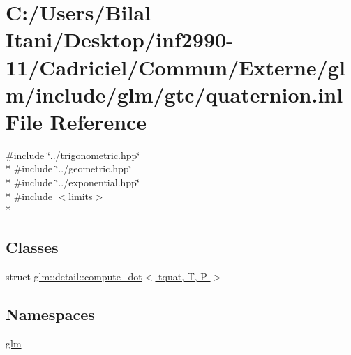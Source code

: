 \hypertarget{glm_2include_2glm_2gtc_2quaternion_8inl}{}\section{C\+:/\+Users/\+Bilal Itani/\+Desktop/inf2990-\/11/\+Cadriciel/\+Commun/\+Externe/glm/include/glm/gtc/quaternion.inl File Reference}
\label{glm_2include_2glm_2gtc_2quaternion_8inl}
{\ttfamily \#include \char`\"{}../trigonometric.\+hpp\char`\"{}}\\*
{\ttfamily \#include \char`\"{}../geometric.\+hpp\char`\"{}}\\*
{\ttfamily \#include \char`\"{}../exponential.\+hpp\char`\"{}}\\*
{\ttfamily \#include $<$limits$>$}\\*
\subsection*{Classes}
\begin{DoxyCompactItemize}
\item 
struct \hyperlink{structglm_1_1detail_1_1compute__dot_3_01tquat_00_01_t_00_01_p_01_4}{glm\+::detail\+::compute\+\_\+dot$<$ tquat, T, P $>$}
\end{DoxyCompactItemize}
\subsection*{Namespaces}
\begin{DoxyCompactItemize}
\item 
 \hyperlink{namespaceglm}{glm}
\end{DoxyCompactItemize}
